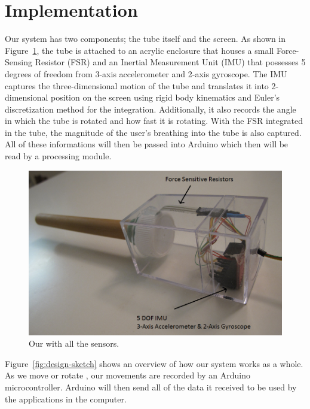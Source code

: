\section{Implementation}\label{sec:impl}

Our \tube system has two components; the tube itself and the screen. As shown in Figure~\ref{fig:impl1}, the tube is attached to an acrylic enclosure that houses a small Force-Sensing Resistor (FSR) and an Inertial Measurement Unit (IMU) that possesses 5 degrees of freedom from 3-axis accelerometer and 2-axis gyroscope. The IMU captures the three-dimensional motion of the tube and translates it into 2-dimensional position on the screen using rigid body kinematics and Euler’s discretization method for the integration. Additionally, it also records the angle in which the tube is rotated and how fast it is rotating. With the FSR integrated in the tube, the magnitude of the user’s breathing into the tube is also captured. All of these informations will then be passed into Arduino which then will be read by a processing module.

\begin{figure}
  \centering
  \includegraphics[width=\linewidth]{./figs/impl1.png}
  \caption{Our \tube with all the sensors.}
  \label{fig:impl1}
\end{figure}

Figure~\ref{fig:design-sketch} shows an overview of how our \tube system works as a whole. As we move or rotate \tube, our movements are recorded by an Arduino microcontroller. Arduino will then send all of the data it received to be used by the applications in the computer.

